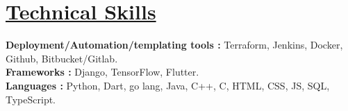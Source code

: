 \documentclass[letterpaper,11pt]{article}
\newcommand{\resumeItem}[1]{
  \item\small{
    {#1 \vspace{-2pt}}
  }
}
\newcommand{\resumeItemListStart}{\begin{itemize}}
\newcommand{\resumeItemListEnd}{\end{itemize}\vspace{-5pt}}
\begin{document}
\section{\href{https://www.linkedin.com/in/yakkshit/details/skills/}{Technical Skills} \faLink}
\vspace{-5pt}
 \begin{itemize}[leftmargin=0.15in, label={}]
    \small{\item{
     \textbf{Deployment/Automation/templating tools : }{Terraform, Jenkins, Docker, Github, Bitbucket/Gitlab.} \\
     \textbf{Frameworks : }{Django, TensorFlow, Flutter.}\\
     \textbf{Languages : }{ Python, Dart, go lang, Java, C++, C, HTML, CSS, JS, SQL, TypeScript.}\\
    }}
 \end{itemize}
\vspace{-20pt}
\end{document}
